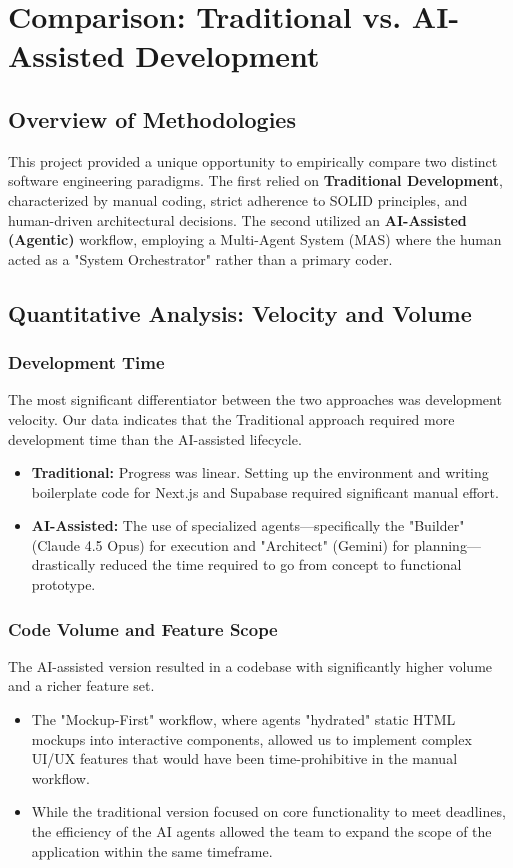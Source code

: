 \documentclass[a4paper,12pt]{report}
\begin{document}
\chapter{Comparison: Traditional vs. AI-Assisted Development}

\section{Overview of Methodologies}
This project provided a unique opportunity to empirically compare two distinct software engineering paradigms. The first relied on \textbf{Traditional Development}, characterized by manual coding, strict adherence to SOLID principles, and human-driven architectural decisions. The second utilized an \textbf{AI-Assisted (Agentic)} workflow, employing a Multi-Agent System (MAS) where the human acted as a "System Orchestrator" rather than a primary coder.

\section{Quantitative Analysis: Velocity and Volume}

\subsection{Development Time}
The most significant differentiator between the two approaches was development velocity. Our data indicates that the Traditional approach required more development time than the AI-assisted lifecycle.

\begin{itemize}
    \item \textbf{Traditional:} Progress was linear. Setting up the environment and writing boilerplate code for Next.js and Supabase required significant manual effort.
    \item \textbf{AI-Assisted:} The use of specialized agents—specifically the "Builder" (Claude 4.5 Opus) for execution and "Architect" (Gemini) for planning—drastically reduced the time required to go from concept to functional prototype.
\end{itemize}

\subsection{Code Volume and Feature Scope}
The AI-assisted version resulted in a codebase with significantly higher volume and a richer feature set.
\begin{itemize}
    \item The "Mockup-First" workflow, where agents "hydrated" static HTML mockups into interactive components, allowed us to implement complex UI/UX features that would have been time-prohibitive in the manual workflow.
    \item While the traditional version focused on core functionality to meet deadlines, the efficiency of the AI agents allowed the team to expand the scope of the application within the same timeframe.
\end{itemize}
\end{document}
